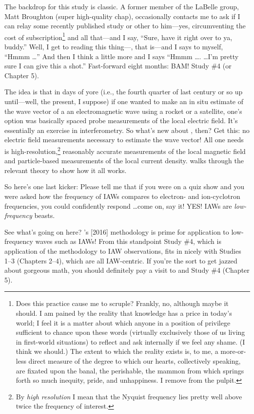 The backdrop for this study is classic. A former member of the LaBelle group,
Matt Broughton (super high-quality chap), occasionally contacts me to ask if I
can relay some recently published study or other to him---yes, circumventing the
cost of subscription\footnote{Does this practice cause me to scruple?  Frankly,
  no, although maybe it should. I am pained by the reality that knowledge has a
  price in today's world; I feel it is a matter about which anyone in a position
  of privilege sufficient to chance upon these words (virtually exclusively
  those of us living in first-world situations) to reflect and ask internally if
  we feel any shame. (I think we should.) The extent to which the reality exists
  is, to me, a more-or-less direct measure of the degree to which our hearts,
  collectively speaking, are fixated upon the banal, the perishable, the mammon
  from which springs forth so much inequity, pride, and unhappiness. I remove
  from the pulpit.} and all that---and I say, ``Sure, have it right over to ya,
buddy.'' Well, I get to reading this thing---\citet{Bellan2016}, that is---and I
says to myself, ``Hmmm \dots'' And then I think a little more and I says ``Hmmm
\dots . \dots I'm pretty sure I can give this a shot.'' Fast-forward eight
months: BAM! Study \#4 (or Chapter 5).

The idea is that in days of yore (i.e., the fourth quarter of last century or so
up until---well, the present, I suppose) if one wanted to make an in situ
estimate of the wave vector of a an electromagnetic wave using a rocket or a
satellite, one's option was basically spaced probe measurements of the local
electric field. It's essentially an exercise in interferometry. So what's new
about \citet{Bellan2016}, then? Get this: no electric field measurements
necessary to estimate the wave vector! All one needs is
high-resolution,\footnote{By \emph{high resolution} I mean that the Nyquist
  frequency lies pretty well above twice the frequency of interest.} reasonably
accurate measurements of the local magnetic field and particle-based
measurements of the local current density. \citet{Bellan2016} walks through the
relevant theory to show how it all works.

So here's one last kicker: Please tell me that if you were on a quiz show and
you were asked how the frequency of IAWs compares to electron- and ion-cyclotron
frequencies, you could confidently respond \dots come on, say it! YES! IAWs are
\emph{low-frequency} beasts.

See what's going on here?  \citeauthor{Bellan2016}'s [2016] methodology is prime
for application to low-frequency waves such as IAWs! From this standpoint Study
\#4, which is application of the \citet{Bellan2016} methodology to IAW
observations, fits in nicely with Studies 1--3 (Chapters 2--4), which are all
IAW-centric. If you're the sort to get jazzed about gorgeous math, you should
definitely pay a visit to \citet{Bellan2016} and Study \#4 (Chapter 5).

